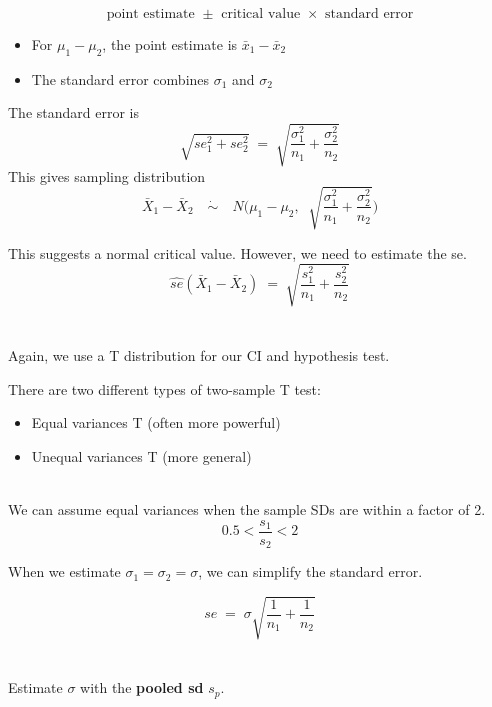 \documentclass[xcolor={dvipsnames,svgnames},14pt]{beamer}
\begin{document}
\begin{frame}
$$\text{point estimate } \pm \text{ critical value } \times \text{ standard error}$$
\begin{itemize}
\item For $\mu_1 - \mu_2$, the point estimate is $\bar{x}_1 - \bar{x}_2$
\item The standard error combines $\sigma_1$ and $\sigma_2$
\end{itemize}
\end{frame}

\begin{frame}
The standard error is
$$\sqrt{se_1^2 + se_2^2} \;=\; \sqrt{\frac{\sigma^2_1}{n_1} + \frac{\sigma^2_2}{n_2}}$$
This gives sampling distribution
$$\bar{X}_1 - \bar{X}_2 \quad\dot{\sim} \quad N\Big(\mu_1 - \mu_2,\;\; \sqrt{\frac{\sigma^2_1}{n_1} + \frac{\sigma^2_2}{n_2}}\Big)$$
\end{frame}


\begin{frame}
This suggests a normal critical value.  However, we need to estimate the se.
$$\hat{se}(\bar{X}_1 - \bar{X}_2) \;=\; \sqrt{\frac{s^2_1}{n_1} + \frac{s^2_2}{n_2}}$$
\\~\\
Again, we use a T distribution for our CI and hypothesis test.
\end{frame}


\begin{frame}
There are two different types of two-sample T test:  \begin{itemize}
\item Equal variances T (often more powerful)
\item Unequal variances T (more general) \\~\\
\end{itemize}
We can assume equal variances when the sample SDs are within a factor of 2. 
$$0.5 < \frac{s_1}{s_2} < 2$$
\end{frame}

\begin{frame}
When we estimate $\sigma_1 = \sigma_2 = \sigma$, we can simplify the standard error.

$$se \;=\; \sigma \sqrt{\frac{1}{n_1} + \frac{1}{n_2}}$$ \\~\\

Estimate $\sigma$ with the \textbf{pooled sd} $s_p$.
\end{frame}
\end{document}
